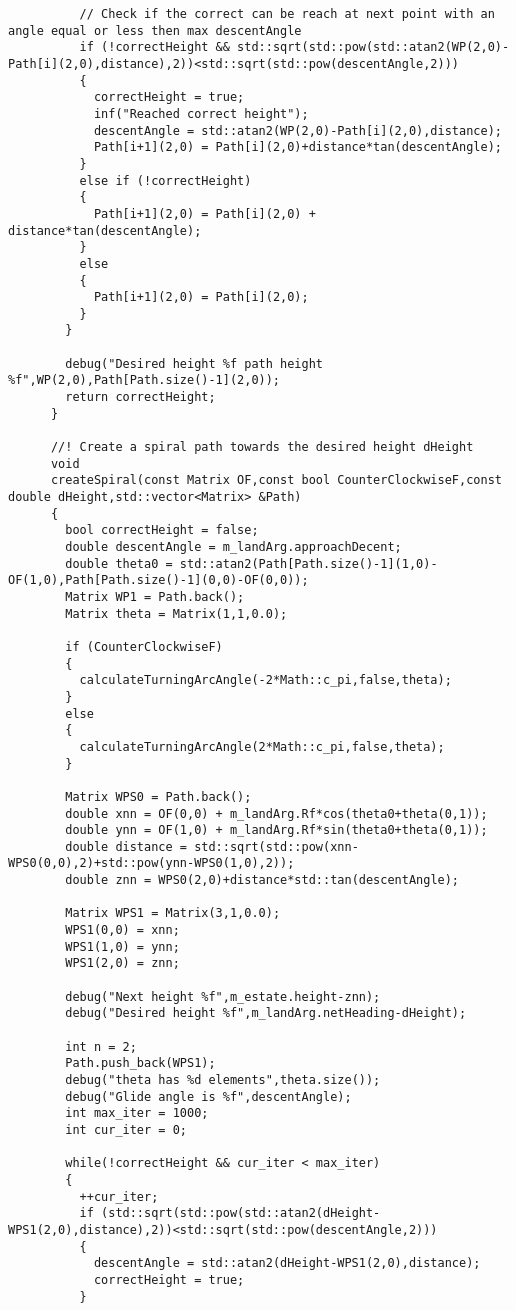 \begin{frame}[fragile]
\begin{lstlisting}
          // Check if the correct can be reach at next point with an angle equal or less then max descentAngle
          if (!correctHeight && std::sqrt(std::pow(std::atan2(WP(2,0)-Path[i](2,0),distance),2))<std::sqrt(std::pow(descentAngle,2)))
          {
            correctHeight = true;
            inf("Reached correct height");
            descentAngle = std::atan2(WP(2,0)-Path[i](2,0),distance);
            Path[i+1](2,0) = Path[i](2,0)+distance*tan(descentAngle);
          }
          else if (!correctHeight)
          {
            Path[i+1](2,0) = Path[i](2,0) + distance*tan(descentAngle);
          }
          else
          {
            Path[i+1](2,0) = Path[i](2,0);
          }
        }

        debug("Desired height %f path height %f",WP(2,0),Path[Path.size()-1](2,0));
        return correctHeight;
      }

      //! Create a spiral path towards the desired height dHeight
      void
      createSpiral(const Matrix OF,const bool CounterClockwiseF,const double dHeight,std::vector<Matrix> &Path)
      {
        bool correctHeight = false;
        double descentAngle = m_landArg.approachDecent;
        double theta0 = std::atan2(Path[Path.size()-1](1,0)-OF(1,0),Path[Path.size()-1](0,0)-OF(0,0));
        Matrix WP1 = Path.back();
        Matrix theta = Matrix(1,1,0.0);

        if (CounterClockwiseF)
        {
          calculateTurningArcAngle(-2*Math::c_pi,false,theta);
        }
        else
        {
          calculateTurningArcAngle(2*Math::c_pi,false,theta);
        }

        Matrix WPS0 = Path.back();
        double xnn = OF(0,0) + m_landArg.Rf*cos(theta0+theta(0,1));
        double ynn = OF(1,0) + m_landArg.Rf*sin(theta0+theta(0,1));
        double distance = std::sqrt(std::pow(xnn-WPS0(0,0),2)+std::pow(ynn-WPS0(1,0),2));
        double znn = WPS0(2,0)+distance*std::tan(descentAngle);

        Matrix WPS1 = Matrix(3,1,0.0);
        WPS1(0,0) = xnn;
        WPS1(1,0) = ynn;
        WPS1(2,0) = znn;

        debug("Next height %f",m_estate.height-znn);
        debug("Desired height %f",m_landArg.netHeading-dHeight);

        int n = 2;
        Path.push_back(WPS1);
        debug("theta has %d elements",theta.size());
        debug("Glide angle is %f",descentAngle);
        int max_iter = 1000;
        int cur_iter = 0;

        while(!correctHeight && cur_iter < max_iter)
        {
          ++cur_iter;
          if (std::sqrt(std::pow(std::atan2(dHeight-WPS1(2,0),distance),2))<std::sqrt(std::pow(descentAngle,2)))
          {
            descentAngle = std::atan2(dHeight-WPS1(2,0),distance);
            correctHeight = true;
          }


\end{lstlisting}
\end{frame}
